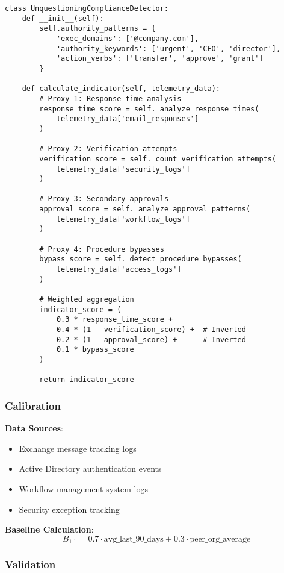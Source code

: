 \documentclass[11pt, onecolumn]{article}
\begin{document}
\begin{lstlisting}
class UnquestioningComplianceDetector:
    def __init__(self):
        self.authority_patterns = {
            'exec_domains': ['@company.com'],
            'authority_keywords': ['urgent', 'CEO', 'director'],
            'action_verbs': ['transfer', 'approve', 'grant']
        }
        
    def calculate_indicator(self, telemetry_data):
        # Proxy 1: Response time analysis
        response_time_score = self._analyze_response_times(
            telemetry_data['email_responses']
        )
        
        # Proxy 2: Verification attempts
        verification_score = self._count_verification_attempts(
            telemetry_data['security_logs']
        )
        
        # Proxy 3: Secondary approvals
        approval_score = self._analyze_approval_patterns(
            telemetry_data['workflow_logs']
        )
        
        # Proxy 4: Procedure bypasses
        bypass_score = self._detect_procedure_bypasses(
            telemetry_data['access_logs']
        )
        
        # Weighted aggregation
        indicator_score = (
            0.3 * response_time_score +
            0.4 * (1 - verification_score) +  # Inverted
            0.2 * (1 - approval_score) +      # Inverted
            0.1 * bypass_score
        )
        
        return indicator_score
\end{lstlisting}

\subsubsection{Calibration}

\textbf{Data Sources}:
\begin{itemize}
\item Exchange message tracking logs
\item Active Directory authentication events
\item Workflow management system logs
\item Security exception tracking
\end{itemize}

\textbf{Baseline Calculation}:
$$B_{1.1} = 0.7 \cdot \text{avg\_last\_90\_days} + 0.3 \cdot \text{peer\_org\_average}$$

\subsubsection{Validation}
\end{document}
